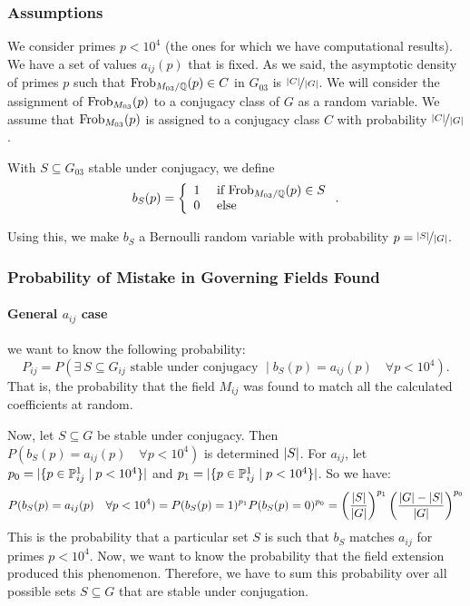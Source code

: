 \subsubsection{Assumptions}
We consider primes $p<10^4$ (the ones for which we have computational results).
We have a set of values $a_{ij}(p)$ that is fixed.
As we said, the asymptotic density of primes $p$ such that $\text{Frob}_{M_{03}/\mathbb{Q}}(p) \in C$ in $G_{03}$ is $\nicefrac{| C |}{| G |}$.
We will consider the assignment of $\text{Frob}_{M_{03}}(p)$ to a conjugacy class of $G$ as a random variable.
We assume that $\text{Frob}_{M_{03}}(p)$ is assigned to a conjugacy class $C$ with probability $\nicefrac{| C |}{| G |}$.

With $S \subseteq G_{03}$ stable under conjugacy, we define $$b_S(p) = \left\lbrace \begin{array}{l}
1 \quad \text{ if } \text{Frob}_{M_{03}/\mathbb{Q}}(p) \in S \\
0 \quad \text{ else }
\end{array} \right..$$

Using this, we make $b_S$ a Bernoulli random variable with probability $p = \nicefrac{| S |}{| G |}$.

\subsubsection{Probability of Mistake in Governing Fields Found}
\paragraph{General $a_{ij}$ case}
we want to know the following probability:
$$P_{ij} = P(\exists \ S \subseteq G_{ij} \text{ stable under conjugacy } \mid b_S(p) = a_{ij}(p) \quad \forall p<10^4).$$
That is, the probability that the field $M_{ij}$ was found to match all the calculated coefficients at random.

Now, let $S \subseteq G$ be stable under conjugacy.
Then $P(b_S(p) = a_{ij}(p) \quad \forall p<10^4)$ is determined $| S |$.
For $a_{ij}$, let $p_0 = |  \{ p \in \mathbb{P}_{ij}^1 \mid p<10^4 \}  |$ and $p_1 = |  \{ p \in \mathbb{P}_{ij}^1 \mid p<10^4 \}  |$.
So we have:
$$
P(b_S(p)=a_{ij}(p) \quad \forall p<10^4)
= P(b_S(p)=1)^{p_1}P(b_S(p)=0)^{p_0}
= \left( \frac{| S |}{| G |} \right)^{p_1}
\left( \frac{| G |-| S |}{| G |} \right)^{p_0}
$$
This is the probability that a particular set $S$ is such that $b_S$ matches $a_{ij}$ for primes $p<10^4$.
Now, we want to know the probability that the field extension produced this phenomenon.
Therefore, we have to sum this probability over all possible sets $S \subseteq G$ that are stable under conjugation.

